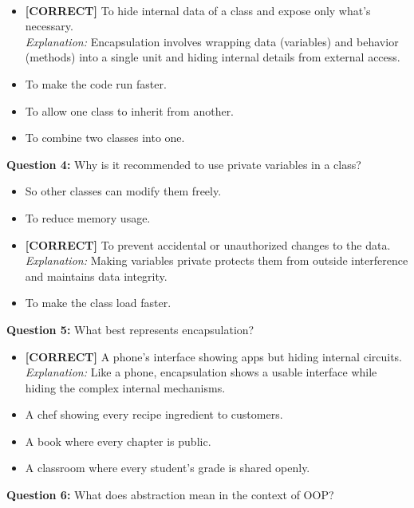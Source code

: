 \\[0.2cm]
\begin{itemize}
 \item \textbf{[CORRECT]} To hide internal data of a class and expose only what's necessary.
\\[0.1cm]
\textit{Explanation:} 
Encapsulation involves wrapping data (variables) and behavior (methods) into a single unit and hiding internal details from external access.
 \item To make the code run faster.
 \item To allow one class to inherit from another.
 \item To combine two classes into one.
\end{itemize}
\vspace{0.3cm}
\noindent
\textbf{Question 4:} Why is it recommended to use private variables in a class?
\\[0.2cm]
\begin{itemize}
 \item So other classes can modify them freely.
 \item To reduce memory usage.
 \item \textbf{[CORRECT]} To prevent accidental or unauthorized changes to the data.
\\[0.1cm]
\textit{Explanation:} 
Making variables private protects them from outside interference and maintains data integrity.
 \item To make the class load faster.
\end{itemize}
\vspace{0.3cm}
\noindent
\textbf{Question 5:} What best represents encapsulation?
\\[0.2cm]
\begin{itemize}
 \item \textbf{[CORRECT]} A phone's interface showing apps but hiding internal circuits.
\\[0.1cm]
\textit{Explanation:} 
Like a phone, encapsulation shows a usable interface while hiding the complex internal mechanisms.
 \item A chef showing every recipe ingredient to customers.
 \item A book where every chapter is public.
 \item A classroom where every student's grade is shared openly.
\end{itemize}
\vspace{0.3cm}
\noindent
\textbf{Question 6:} What does abstraction mean in the context of OOP?
\\[0.2cm]
